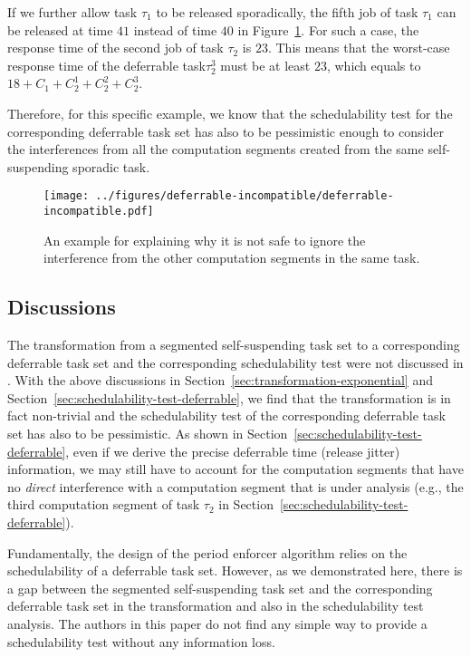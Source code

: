 If we further allow task $\tau_1$ to be released sporadically, the fifth job of task $\tau_1$ can be released at time $41$ instead of time $40$ in Figure~\ref{fig:example-deferrable-incompatible}. For such a case, the response time of the second job of task $\tau_2$ is $23$. This means that the worst-case response time of the deferrable task$\tau_2^3$ must be at least $23$, which equals to $18+C_1 + C_2^1+C_2^2+C_2^3$.

Therefore, for this specific example, we know that the schedulability test for the  corresponding deferrable task set has also to be pessimistic enough to consider the interferences from all the computation segments created from the same self-suspending sporadic task.

\begin{figure}[t]
  \centering  
  \texttt{[image: ../figures/deferrable-incompatible/deferrable-incompatible.pdf]}
  \caption{An example for explaining why it is not safe to ignore the interference from the other computation segments in the same task.}
  \label{fig:example-deferrable-incompatible}
\end{figure}

\subsection{Discussions}
\label{sec:discussions-deferrable}

The transformation from a segmented self-suspending task set to a corresponding deferrable task set and the corresponding schedulability test were not discussed in \cite{Raj:suspension1991}. With the above discussions in Section~\ref{sec:transformation-exponential} and Section~\ref{sec:schedulability-test-deferrable}, we find that the transformation is in fact non-trivial and the schedulability test of the corresponding deferrable task set has also to be pessimistic. As shown in Section~\ref{sec:schedulability-test-deferrable}, even if we derive the precise deferrable time (release jitter) information, we may still have to account for the computation segments that have no \emph{direct} interference with a computation segment that is under analysis (e.g., the third computation segment of task $\tau_2$ in Section~\ref{sec:schedulability-test-deferrable}).

Fundamentally, the design of the period enforcer algorithm relies on the schedulability of a deferrable task set. However, as we demonstrated here, there is a gap between the segmented self-suspending task set and the corresponding deferrable task set in the transformation and also in the schedulability test analysis. The authors in this paper do not find any simple way to provide a schedulability test without any information loss.

